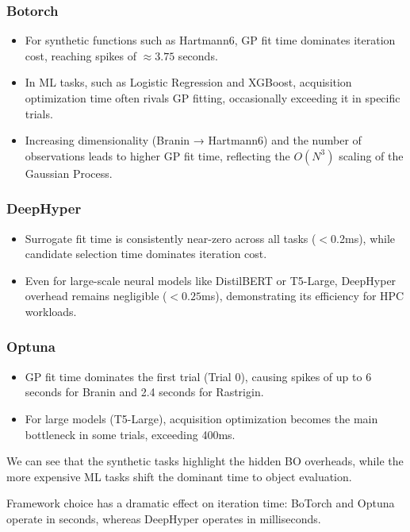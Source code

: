 \documentclass[11pt]{article}
\begin{document}
\subsubsection{Botorch}
\begin{itemize}
    \item For synthetic functions such as Hartmann6, GP fit time dominates iteration cost, reaching spikes of $\approx3.75$ seconds.
    \item In ML tasks, such as Logistic Regression and XGBoost, acquisition optimization time often rivals GP fitting, occasionally exceeding it in specific trials.
    \item Increasing dimensionality (Branin → Hartmann6) and the number of observations leads to higher GP fit time, reflecting the $O(N^3)$ scaling of the Gaussian Process.
\end{itemize}
\subsubsection{DeepHyper}
\begin{itemize}
    \item Surrogate fit time is consistently near-zero across all tasks ($<$0.2ms), while candidate selection time dominates iteration cost.
    \item Even for large-scale neural models like DistilBERT or T5-Large, DeepHyper overhead remains negligible ($<0.25$ms), demonstrating its efficiency for HPC workloads.
\end{itemize}

\subsubsection{Optuna}
\begin{itemize}
    \item GP fit time dominates the first trial (Trial 0), causing spikes of up to 6 seconds for Branin and 2.4 seconds for Rastrigin.
    \item For large models (T5-Large), acquisition optimization becomes the main bottleneck in some trials, exceeding 400ms.

\end{itemize}

We can see that the synthetic tasks highlight the hidden BO overheads, while the more expensive ML tasks shift the dominant time to object evaluation.

Framework choice has a dramatic effect on iteration time: BoTorch and Optuna operate in seconds, whereas DeepHyper operates in milliseconds.
\end{document}
